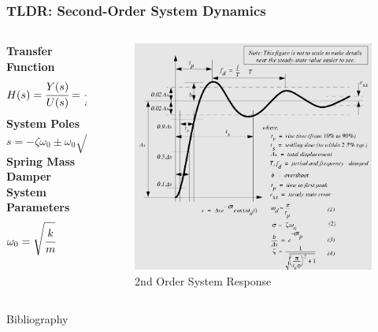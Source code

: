 \documentclass[aspectratio=169]{beamer}
\begin{document}
\begin{frame}
	\frametitle{TLDR: Second-Order System Dynamics}
	\begin{columns}
		\begin{column}{0.5\textwidth}
			\textbf{Transfer Function}
			\[
				H(s) 
				= \cfrac{Y(s)}{U(s)} 
				= \cfrac{
					\omega_0^2
				}{
					s^2 + 2 \zeta \omega_0 s + \omega_0^2
				}
			\]
			\textbf{System Poles}
			\[
				s = - \zeta \omega_0 \pm \omega_0 \sqrt{1 - \zeta^2}
			\]
			\textbf{Spring Mass Damper System Parameters}
			\[
				\omega_0 = \sqrt{\cfrac{k}{m}}
				\hspace{0.5 in}
				\zeta = \sqrt{\cfrac{c^2}{4 m k}}
			\]
		\end{column}
		\begin{column}{0.375\textwidth}
			\begin{figure}[]
				\includegraphics[width=\textwidth]{Images/2ndOrderTransient.png}
				2nd Order System Response \cite{engineerOnADisk_2ndOrderDynamics}
			\end{figure}
		\end{column}
	\end{columns}
\end{frame}

\begin{frame}[allowframebreaks]{Bibliography}
	
	
\end{frame}
\end{document}
